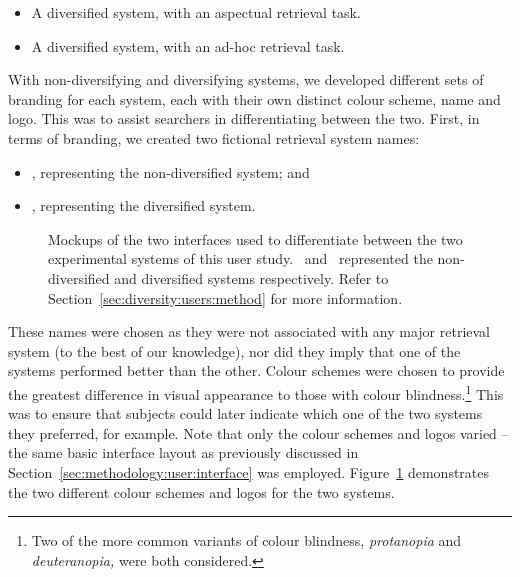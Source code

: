 \begin{itemize}
    \item{ A diversified system, with an aspectual retrieval task.}
    \item{ A diversified system, with an ad-hoc retrieval task.}
\end{itemize}

With non-diversifying and diversifying systems, we developed different sets of branding for each system, each with their own distinct colour scheme, name and logo. This was to assist searchers in differentiating between the two. First, in terms of branding, we created two fictional retrieval system names:

\begin{itemize}
    \item{\hula, representing the non-diversified  system; and}
    \item{\yoyo, representing the diversified  system.}
\end{itemize}

\begin{figure}[t!]
    \centering
    \caption[Diversity user study interface mockups]{Mockups of the two interfaces used to differentiate between the two experimental systems of this user study. \hula~and \yoyo~represented the non-diversified and diversified systems respectively. Refer to Section~\ref{sec:diversity:users:method} for more information.}
    \label{fig:interface_headers}
\end{figure}

These names were chosen as they were not associated with any major retrieval system (to the best of our knowledge), nor did they imply that one of the systems performed better than the other. Colour schemes were chosen to provide the greatest difference in visual appearance to those with colour blindness.\footnote{Two of the more common variants of colour blindness, \emph{protanopia} and \emph{deuteranopia,} were both considered.} This was to ensure that subjects could later indicate which one of the two systems they preferred, for example. Note that only the colour schemes and logos varied -- the same basic interface layout as previously discussed in Section~\ref{sec:methodology:user:interface} was employed. Figure~\ref{fig:interface_headers} demonstrates the two different colour schemes and logos for the two systems.

